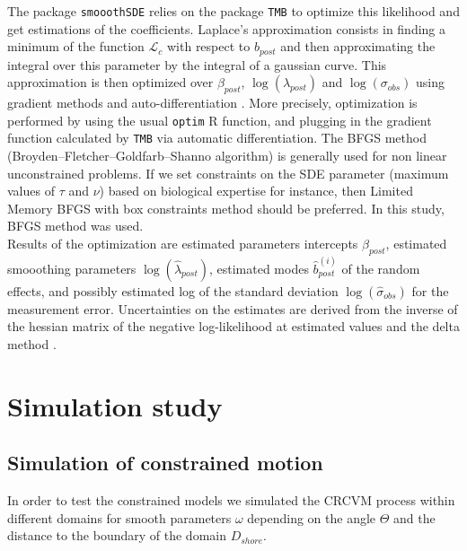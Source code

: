 \documentclass[11pt]{article}
\newcommand {\1}{\mathbb{1}}
\begin{document}
The package \texttt{smooothSDE} relies on the package \texttt{TMB} to optimize this likelihood and get estimations of the coefficients.
Laplace's approximation consists in finding a minimum of the function $\mathcal{L}_c$ with respect to $b_{post}$ and then approximating the integral over this parameter by the integral of a gaussian curve.
This approximation is then optimized over $\beta_{post}$, $\log(\lambda_{post})$ and $\log(\sigma_{obs})$ using gradient methods and auto-differentiation \cite{kristensen_tmb_2016}. More precisely, optimization is  performed by using the usual \texttt{optim} R function, and plugging in the gradient function calculated by \texttt{TMB} via automatic differentiation. The BFGS method (Broyden–Fletcher–Goldfarb–Shanno algorithm) is generally used for non linear unconstrained problems. If we set constraints on the SDE parameter (maximum values of $\tau$ and $\nu$) based on biological expertise for instance, then Limited Memory BFGS with box constraints method should be preferred. In this study, BFGS method was used.\\
Results of the optimization are estimated parameters intercepts $\hat{\beta}_{post}$, estimated smooothing parameters $\log(\hat{\lambda}_{post})$, estimated modes $\hat{b}_{post}^{(i)}$ of the random effects, and possibly estimated log of the standard deviation $\log(\hat{\sigma}_{obs})$ for the measurement error.
Uncertainties on the estimates are derived from the inverse of the hessian matrix of the negative log-likelihood at estimated values and the delta method \cite{kristensen_tmb_2016}.



\section{Simulation study}
\label{section: simulation study}





\subsection{Simulation of constrained motion}
In order to test the constrained models we simulated the CRCVM process within different domains for smooth parameters $\omega$ depending on the angle $\Theta$ and the distance to the boundary of the domain $D_{shore}$.\\
\end{document}
